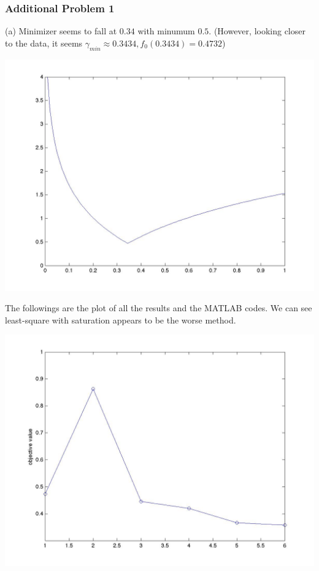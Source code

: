 \documentclass[12pt,a4paper]{article}
\begin{document}
\newpage\subsubsection*{Additional Problem 1}
\noindent (a) Minimizer seems to fall at $0.34$ with minumum $0.5$. (However, looking closer to the data, it seems $\gamma_{min} \approx 0.3434, f_0(0.3434) = 0.4732$) \\
\begin{center}
\includegraphics[scale=0.3]{hw1_p2_a.jpg}
\end{center}
The followings are the plot of all the results and the MATLAB codes. We can see least-square with saturation appears to be the worse method. 
\begin{center}
\includegraphics[scale=0.3]{hw1_p2.jpg}
\end{center}
\end{document}
